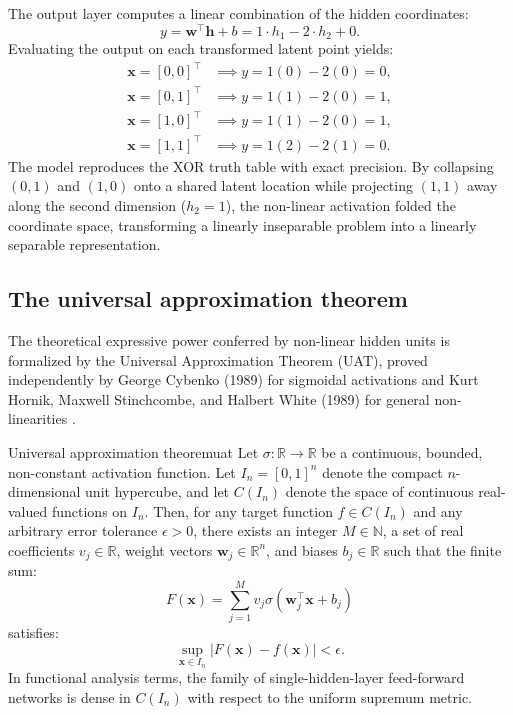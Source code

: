 \documentclass[../../../main.tex]{subfiles}
\begin{document}
The output layer computes a linear combination of the hidden coordinates:
\begin{equation}
y = \mathbf{w}^\top \mathbf{h} + b = 1 \cdot h_1 - 2 \cdot h_2 + 0.
\end{equation}
Evaluating the output on each transformed latent point yields:
\begin{align}
\mathbf{x} = [0, 0]^\top &\implies y = 1(0) - 2(0) = 0, \\
\mathbf{x} = [0, 1]^\top &\implies y = 1(1) - 2(0) = 1, \\
\mathbf{x} = [1, 0]^\top &\implies y = 1(1) - 2(0) = 1, \\
\mathbf{x} = [1, 1]^\top &\implies y = 1(2) - 2(1) = 0.
\end{align}
The model reproduces the XOR truth table with exact precision. By collapsing $(0,1)$ and $(1,0)$ onto a shared latent location while projecting $(1,1)$ away along the second dimension ($h_2 = 1$), the non-linear activation folded the coordinate space, transforming a linearly inseparable problem into a linearly separable representation.

\subsection{The universal approximation theorem}
\label{subsec:universal_approximation_theorem}

The theoretical expressive power conferred by non-linear hidden units is formalized by the Universal Approximation Theorem (UAT), proved independently by George Cybenko (1989) for sigmoidal activations \citep{cybenko1989} and Kurt Hornik, Maxwell Stinchcombe, and Halbert White (1989) for general non-linearities \citep{hornik1989}.

\begin{theorem}{Universal approximation theorem}{uat}
Let $\sigma: \mathbb{R} \to \mathbb{R}$ be a continuous, bounded, non-constant activation function. Let $I_n = [0, 1]^n$ denote the compact $n$-dimensional unit hypercube, and let $C(I_n)$ denote the space of continuous real-valued functions on $I_n$. Then, for any target function $f \in C(I_n)$ and any arbitrary error tolerance $\epsilon > 0$, there exists an integer $M \in \mathbb{N}$, a set of real coefficients $v_j \in \mathbb{R}$, weight vectors $\mathbf{w}_j \in \mathbb{R}^n$, and biases $b_j \in \mathbb{R}$ such that the finite sum:
\begin{equation}
F(\mathbf{x}) = \sum_{j=1}^M v_j \sigma\left(\mathbf{w}_j^\top \mathbf{x} + b_j\right)
\end{equation}
satisfies:
\begin{equation}
\sup_{\mathbf{x} \in I_n} \left| F(\mathbf{x}) - f(\mathbf{x}) \right| < \epsilon.
\end{equation}
In functional analysis terms, the family of single-hidden-layer feed-forward networks is dense in $C(I_n)$ with respect to the uniform supremum metric.
\end{theorem}
\end{document}
